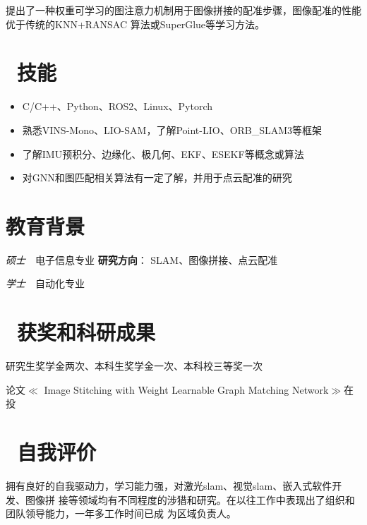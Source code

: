 \documentclass{resume}
\begin{document}
\hspace{20pt} 提出了一种权重可学习的图注意力机制用于图像拼接的配准步骤，图像配准的性能优于传统的KNN+RANSAC
算法或SuperGlue等学习方法。
\section{\textcolor[RGB]{50,50,190}{\faCogs\ 技能}}
\begin{itemize}[parsep=0.5ex]
  \item C/C++、Python、ROS2、Linux、Pytorch
  \item 熟悉VINS-Mono、LIO-SAM，了解Point-LIO、ORB\_SLAM3等框架
  \item 了解IMU预积分、边缘化、极几何、EKF、ESEKF等概念或算法
  \item 对GNN和图匹配相关算法有一定了解，并用于点云配准的研究

\end{itemize}


\section{\textcolor[RGB]{50,50,190}{\faGraduationCap 教育背景}}
\textit{硕士}\ \ 电子信息专业 \qquad \qquad
\textcolor[RGB]{80,100,190}{\textbf{研究方向}}：
SLAM、图像拼接、点云配准


\textit{学士}\ \ 自动化专业


%
%

\section{\textcolor[RGB]{50,50,190}{\faPaperPlane\ 获奖和科研成果}}
研究生奖学金两次、本科生奖学金一次、本科校三等奖一次

论文$\ll$ Image Stitching with Weight Learnable Graph Matching Network$\gg$在投
\section{\textcolor[RGB]{50,50,190}{\faChild\ 自我评价}}
拥有良好的自我驱动力，学习能力强，对激光slam、视觉slam、嵌入式软件开发、图像拼
接等领域均有不同程度的涉猎和研究。在以往工作中表现出了组织和团队领导能力，一年多工作时间已成
为区域负责人。


%
%
\end{document}
